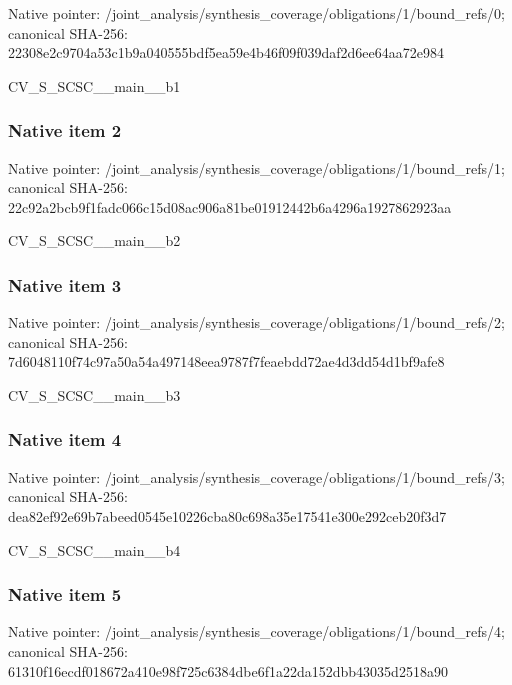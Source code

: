 \documentclass[10pt,a4paper]{article}
\begin{document}
Native pointer: /joint\_analysis/synthesi\allowbreak{}s\_coverage/obligations/1\allowbreak{}/bound\_refs/0; canonical SHA-256: 22308e2c9704a53c1b9a0405\allowbreak{}55bdf5ea59e4b46f09f039da\allowbreak{}f2d6ee64aa72e984


CV\_S\_SCSC\_\_main\_\_b1


\subsubsection{Native item 2}


Native pointer: /joint\_analysis/synthesi\allowbreak{}s\_coverage/obligations/1\allowbreak{}/bound\_refs/1; canonical SHA-256: 22c92a2bcb9f1fadc066c15d\allowbreak{}08ac906a81be01912442b6a4\allowbreak{}296a1927862923aa


CV\_S\_SCSC\_\_main\_\_b2


\subsubsection{Native item 3}


Native pointer: /joint\_analysis/synthesi\allowbreak{}s\_coverage/obligations/1\allowbreak{}/bound\_refs/2; canonical SHA-256: 7d6048110f74c97a50a54a49\allowbreak{}7148eea9787f7feaebdd72ae\allowbreak{}4d3dd54d1bf9afe8


CV\_S\_SCSC\_\_main\_\_b3


\subsubsection{Native item 4}


Native pointer: /joint\_analysis/synthesi\allowbreak{}s\_coverage/obligations/1\allowbreak{}/bound\_refs/3; canonical SHA-256: dea82ef92e69b7abeed0545e\allowbreak{}10226cba80c698a35e17541e\allowbreak{}300e292ceb20f3d7


CV\_S\_SCSC\_\_main\_\_b4


\subsubsection{Native item 5}


Native pointer: /joint\_analysis/synthesi\allowbreak{}s\_coverage/obligations/1\allowbreak{}/bound\_refs/4; canonical SHA-256: 61310f16ecdf018672a410e9\allowbreak{}8f725c6384dbe6f1a22da152\allowbreak{}dbb43035d2518a90
\end{document}
